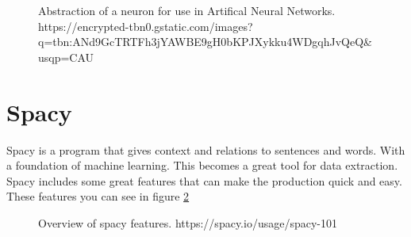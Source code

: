 \begin{figure}[h]
    \caption{Abstraction of a neuron for use in Artifical Neural Networks. https://encrypted-tbn0.gstatic.com/images?q=tbn:ANd9GcTRTFh3jYAWBE9gH0bKPJXykku4WDgqhJvQeQ&usqp=CAU}
    \label{fig:figure2.4}
\end{figure}

\section{Spacy}\label{sec:spacy}

Spacy is a program that gives context and relations to sentences and words.
With a foundation of machine learning.
This becomes a great tool for data extraction.
Spacy includes some great features that can make the production quick and easy.
These features you can see in figure \ref{fig:features}
\clearpage

\begin{figure}[h]
    \caption{Overview of spacy features. https://spacy.io/usage/spacy-101}
    \label{fig:features}
\end{figure}

